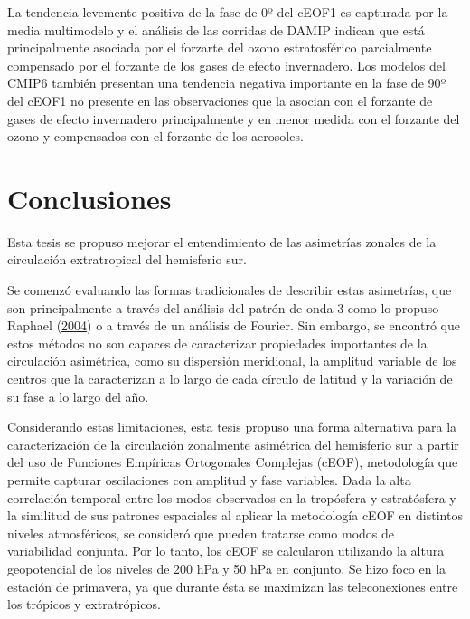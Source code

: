 \documentclass[12pt,oneside,a4paper]{reedthesis}
\begin{document}
La tendencia levemente positiva de la fase de 0º del cEOF1 es capturada por la media multimodelo y el análisis de las corridas de DAMIP indican que está principalmente asociada por el forzarte del ozono estratosférico parcialmente compensado por el forzante de los gases de efecto invernadero.
Los modelos del CMIP6 también presentan una tendencia negativa importante en la fase de 90º del cEOF1 no presente en las observaciones que la asocian con el forzante de gases de efecto invernadero principalmente y en menor medida con el forzante del ozono y compensados con el forzante de los aerosoles.

\hypertarget{conclusiones}{%
\chapter{Conclusiones}\label{conclusiones}}

Esta tesis se propuso mejorar el entendimiento de las asimetrías zonales de la circulación extratropical del hemisferio sur.

Se comenzó evaluando las formas tradicionales de describir estas asimetrías, que son principalmente a través del análisis del patrón de onda 3 como lo propuso Raphael (\protect\hyperlink{ref-raphael2004}{2004}) o a través de un análisis de Fourier.
Sin embargo, se encontró que estos métodos no son capaces de caracterizar propiedades importantes de la circulación asimétrica, como su dispersión meridional, la amplitud variable de los centros que la caracterizan a lo largo de cada círculo de latitud y la variación de su fase a lo largo del año.

Considerando estas limitaciones, esta tesis propuso una forma alternativa para la caracterización de la circulación zonalmente asimétrica del hemisferio sur a partir del uso de Funciones Empíricas Ortogonales Complejas (cEOF), metodología que permite capturar oscilaciones con amplitud y fase variables.
Dada la alta correlación temporal entre los modos observados en la tropósfera y estratósfera y la similitud de sus patrones espaciales al aplicar la metodología cEOF en distintos niveles atmosféricos, se consideró que pueden tratarse como modos de variabilidad conjunta.
Por lo tanto, los cEOF se calcularon utilizando la altura geopotencial de los niveles de 200 hPa y 50 hPa en conjunto.
Se hizo foco en la estación de primavera, ya que durante ésta se maximizan las teleconexiones entre los trópicos y extratrópicos.
\end{document}
